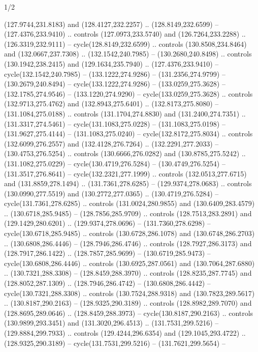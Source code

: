 \begin{flagdescription}{1/2}
\begin{scope}[shift={(0.26984,0.5)},scale=1/2.54]
\begin{scope}[scale=\flagwidth/550]
\begin{scope}
  (127.9744,231.8183) and (128.4127,232.2257) .. (128.8149,232.6599) --
  (127.4376,233.9410) .. controls (127.0973,233.5740) and (126.7264,233.2288) ..
  (126.3319,232.9111) -- cycle(128.8149,232.6599) .. controls
  (130.8508,234.8464) and (132.0667,237.7308) .. (132.1542,240.7985) --
  (130.2680,240.8498) .. controls (130.1942,238.2415) and (129.1634,235.7940) ..
  (127.4376,233.9410) -- cycle(132.1542,240.7985) -- (133.1222,274.9286) --
  (131.2356,274.9799) -- (130.2679,240.8494) -- cycle(133.1222,274.9286) --
  (133.0259,275.3628) -- (132.1785,274.9546) -- (133.1220,274.9290) --
  cycle(133.0259,275.3628) .. controls (132.9713,275.4762) and
  (132.8943,275.6401) .. (132.8173,275.8080) -- (131.1084,275.0188) .. controls
  (131.1704,274.8830) and (131.2400,274.7351) .. (131.3317,274.5461) --
  cycle(131.1083,275.0228) -- (131.1083,275.0198) -- (131.9627,275.4144) --
  (131.1083,275.0240) -- cycle(132.8172,275.8034) .. controls
  (132.6099,276.2557) and (132.4128,276.7264) .. (132.2291,277.2033) --
  (130.4753,276.5254) .. controls (130.6666,276.0282) and (130.8785,275.5242) ..
  (131.1082,275.0229) -- cycle(130.4719,276.5284) -- (130.4749,276.5254) --
  (131.3517,276.8641) -- cycle(132.2321,277.1999) .. controls
  (132.0513,277.6715) and (131.8859,278.1494) .. (131.7361,278.6285) --
  (129.9374,278.0683) .. controls (130.0990,277.5519) and (130.2772,277.0365) ..
  (130.4719,276.5284) -- cycle(131.7361,278.6285) .. controls
  (131.0024,280.9855) and (130.6409,283.4579) .. (130.6718,285.9485) --
  (128.7856,285.9709) .. controls (128.7513,283.2891) and (129.1429,280.6201) ..
  (129.9374,278.0696) -- (131.7360,278.6298) -- cycle(130.6718,285.9485) ..
  controls (130.6728,286.1078) and (130.6748,286.2703) .. (130.6808,286.4446) --
  (128.7946,286.4746) .. controls (128.7927,286.3173) and (128.7917,286.1422) ..
  (128.7857,285.9699) -- (130.6719,285.9473) -- cycle(130.6808,286.4446) ..
  controls (130.6925,287.0561) and (130.7064,287.6880) .. (130.7321,288.3308) --
  (128.8459,288.3970) .. controls (128.8235,287.7745) and (128.8052,287.1309) ..
  (128.7946,286.4742) -- (130.6808,286.4442) -- cycle(130.7321,288.3308) ..
  controls (130.7524,288.9318) and (130.7823,289.5617) .. (130.8187,290.2163) --
  (128.9325,290.3189) .. controls (128.8982,289.7070) and (128.8695,289.0646) ..
  (128.8459,288.3973) -- cycle(130.8187,290.2163) .. controls
  (130.9899,293.3451) and (131.3020,296.4513) .. (131.7531,299.5216) --
  (129.8884,299.7933) .. controls (129.4244,296.6354) and (129.1045,293.4722) ..
  (128.9325,290.3189) -- cycle(131.7531,299.5216) -- (131.7621,299.5654) --

\end{scope}
\end{scope}
\end{scope}
\end{flagdescription}
